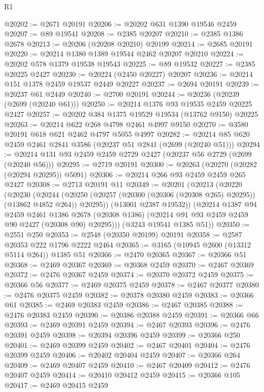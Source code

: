 \begin{lexlean}{R1}
\begin{coremodule}
@20202 := @2671 @20191
@20206 := @20202 @631 @1390 @19546 @2459
@20207 := @89 @19541
@20208 := @2385 @20207
@20210 := @2385 @1386 @2678
@20213 := @20206 (@20208 @20210) @20199
@20214 := @2685 @20191
@20220 := @20214 @1380 @1389 @19544 @2462 @20207 @20210
@20224 := @20202 @578 @1379 @19538 @19543
@20225 := @89 @19532
@20227 := @2385 @20225 @2427
@20230 := @20224 (@2450 @20227) @20207
@20236 := @20214 @151 @1378 @2459 @19537 @2449 @20227
@20237 := @2694 @20191
@20239 := @20237 @61 @2449
@20240 := @2700 @20191
@20244 := @20236 (@20239 (@2699 (@20240 @61)))
@20250 := @20214 @1376 @93 @19535 @2459 @20225 @2427
@20257 := @20202 @384 @1375 @19529 @19534 (@13762 @9150) @20225
@20263 := @20214 @622 @268 @4798 @2461 @4997 @9150
@20270 := @3580 @20191 @618 @621 @2462 @4797 @5055 @4997
@20282 := @20214 @85 @620 @2459 @2461 @2841 @3586 (@20237 @51 @2841 (@2699 (@20240 @51)))
@20294 := @20214 @131 @93 @2459 @2459 @2729 @2427 (@20237 @56 @2729 (@2699 (@20240 @56)))
@20295 := @2719 @20191
@20300 := @20263 (@20270 (@20282 (@20294 @20295)) @5091)
@20306 := @20214 @266 @93 @2459 @2459 @265 @2427
@20308 := @2713 @20191 @11
@20349 := @20201
    (@20213
      (@20220
        (@20230
          (@20244
            (@20250 (@20257 (@20300 (@20306 (@20308 @265) @20295)) (@13862 @4852 @264)) @20295))
          (@13001 @2387 @19532))
        (@20214
          @1387
          @94
          @2459
          @2461
          @1386
          @2678
          (@20308 @1386)
          (@20214 @91 @93 @2459 @2459 @90 @2427 (@20308 @90) @20295)))
      (@3243 @19541 @1385 @51))
@20350 := @2551 @250
@20353 := @2548 (@20350 @20199) @20191
@20358 := @2587 @20353 @222 @1796 @2222 @2464
@20365 := @3165 (@10945 @2600 (@13312 @5114 @264)) @1385 @51
@20366 := @2470 @20365
@20367 := @20366 @51
@20368 := @2469 @20367
@20369 := @20368 @2459
@20370 := @2467 @20369
@20372 := @2476 @20367 @2459
@20374 := @20370 @20372 @2459
@20375 := @20366 @56
@20377 := @2469 @20375 @2459
@20378 := @2467 @20377
@20380 := @2476 @20375 @2459
@20382 := @20378 @20380 @2459
@20383 := @20366 @61
@20385 := @2469 @20383 @2459
@20386 := @2467 @20385
@20388 := @2476 @20383 @2459
@20390 := @20386 @20388 @2459
@20391 := @20366 @66
@20393 := @2469 @20391 @2459
@20394 := @2467 @20393
@20396 := @2476 @20391 @2459
@20398 := @20394 @20396 @2459
@20399 := @20366 @250
@20401 := @2469 @20399 @2459
@20402 := @2467 @20401
@20404 := @2476 @20399 @2459
@20406 := @20402 @20404 @2459
@20407 := @20366 @264
@20409 := @2469 @20407 @2459
@20410 := @2467 @20409
@20412 := @2476 @20407 @2459
@20414 := @20410 @20412 @2459
@20415 := @20366 @105
@20417 := @2469 @20415 @2459

\end{coremodule}
\end{lexlean}
